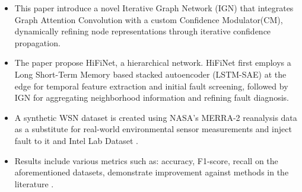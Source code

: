 \begin{itemize}
  \item This paper introduce a novel Iterative Graph Network (IGN) that integrates Graph Attention Convolution with a custom Confidence Modulator(CM), dynamically refining node representations through iterative confidence propagation.
  \item The paper propose HiFiNet, a hierarchical network. HiFiNet first employs a Long Short-Term Memory based stacked autoencoder (LSTM-SAE) at the edge for temporal feature extraction and initial fault screening, followed by IGN for aggregating neighborhood information and refining fault diagnosis.
  \item A synthetic WSN dataset is created using NASA’s MERRA-2 reanalysis data as a substitute for real-world environmental sensor measurements and inject fault to it and Intel Lab Dataset \cite{Intel2004}.
  \item Results include various metrics such as: accuracy, F1-score, recall on the aforementioned datasets, demonstrate improvement against methods in the literature .
\end{itemize}
